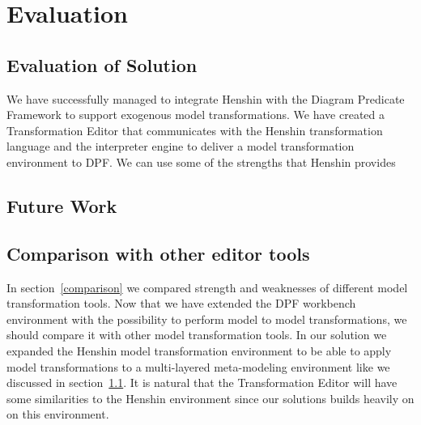 
\chapter{Evaluation} %

\label{Chapter6} %



\section{Evaluation of Solution}
\label{evaluate_solution}
We have successfully managed to integrate Henshin with the Diagram Predicate
Framework to support exogenous model transformations. We have created a
Transformation Editor that communicates with the Henshin transformation language
and the interpreter engine to deliver a model transformation environment to DPF.
We can use some of the strengths that Henshin provides

\section{Future Work}


\section{Comparison with other editor tools}

In section~\ref{comparison} we compared strength and weaknesses of different
model transformation tools. Now that we have extended the DPF workbench
environment with the possibility to perform model to model transformations, we
should compare it with other model transformation tools. In our solution we
expanded the Henshin model transformation environment to be able to apply model
transformations to a multi-layered meta-modeling environment like we discussed
in section~\ref{evaluate_solution}. It is natural that the Transformation
Editor will have some similarities to the Henshin environment since our
solutions builds heavily on on this environment.

